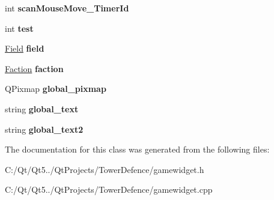 \begin{DoxyCompactItemize}
\item 
\hypertarget{class_game_widget_ac7a38149304b860a2a3f690c610f6716}{}int {\bfseries scan\+Mouse\+Move\+\_\+\+Timer\+Id}\label{class_game_widget_ac7a38149304b860a2a3f690c610f6716}

\item 
\hypertarget{class_game_widget_a2f46358023e42e0b9849262297fa039e}{}int {\bfseries test}\label{class_game_widget_a2f46358023e42e0b9849262297fa039e}

\item 
\hypertarget{class_game_widget_aa34a92f2638851885382ae74f67d7d9d}{}\hyperlink{class_field}{Field} {\bfseries field}\label{class_game_widget_aa34a92f2638851885382ae74f67d7d9d}

\item 
\hypertarget{class_game_widget_a55f1559f835c07444d19a99e9d6abcab}{}\hyperlink{class_faction}{Faction} {\bfseries faction}\label{class_game_widget_a55f1559f835c07444d19a99e9d6abcab}

\item 
\hypertarget{class_game_widget_a6ba8d335ad792d90b4cbb301a6709d89}{}Q\+Pixmap {\bfseries global\+\_\+pixmap}\label{class_game_widget_a6ba8d335ad792d90b4cbb301a6709d89}

\item 
\hypertarget{class_game_widget_a17b01fb6fcca62d39fc6b72470d2807e}{}string {\bfseries global\+\_\+text}\label{class_game_widget_a17b01fb6fcca62d39fc6b72470d2807e}

\item 
\hypertarget{class_game_widget_a2fcb0b2598a800d9b7a1facc7368e970}{}string {\bfseries global\+\_\+text2}\label{class_game_widget_a2fcb0b2598a800d9b7a1facc7368e970}

\end{DoxyCompactItemize}


The documentation for this class was generated from the following files\+:\begin{DoxyCompactItemize}
\item 
C\+:/\+Qt/\+Qt5../\+Qt\+Projects/\+Tower\+Defence/gamewidget.\+h\item 
C\+:/\+Qt/\+Qt5../\+Qt\+Projects/\+Tower\+Defence/gamewidget.\+cpp\end{DoxyCompactItemize}
